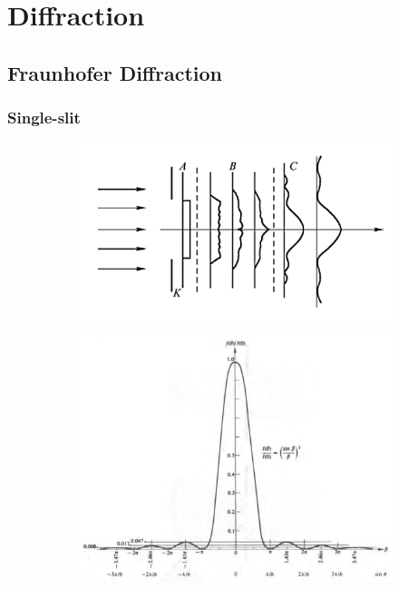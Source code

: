 \chapter{Diffraction}

\section{Fraunhofer Diffraction}

\subsection{Single-slit}

\begin{figure}[H]
  \centering
  \begin{subfigure}{.5\textwidth}
    \centering
    \includegraphics[width=\linewidth]{figures/Fraunhofer-Fresnel-Diffraction}
  \end{subfigure}
  \begin{subfigure}{.45\textwidth}
    \centering
    \includegraphics[width=\linewidth]{figures/Fraunhofer-Diffraction-Irradance}
  \end{subfigure}
\end{figure}

